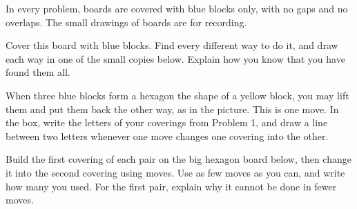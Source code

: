 \documentclass[12pt]{article}
\begin{document}
In every problem, boards are covered with blue blocks only, with no gaps and no overlaps. The small drawings of boards are for recording.

\bigskip
{} Cover this board with blue blocks. Find every different way to do it, and draw each way in one of the small copies below. Explain how you know that you have found them all.

\vspace{0.3in}

\vspace{0.45in}
\centering
{}\hspace{0.35in}\hspace{0.35in}

\vspace{0.3in}
\hspace{0.35in}\hspace{0.35in}

\vspace{0.3in}
\hspace{0.35in}\hspace{0.35in}

\raggedright
\newpage

 When three blue blocks form a hexagon the shape of a yellow block, you may lift them and put them back the other way, as in the picture. This is one move. In the box, write the letters of your coverings from Problem 1, and draw a line between two letters whenever one move changes one covering into the other.

\vspace{0.3in}
\centering
{}\hspace{0.25in}\raisebox{0.55in}{\lrarrow}\hspace{0.25in}

\vspace{0.35in}
\framebox[\linewidth]{\rule{0pt}{4.6in}}

\raggedright
\newpage

 Build the first covering of each pair on the big hexagon board below, then change it into the second covering using moves. Use as few moves as you can, and write how many you used. For the first pair, explain why it cannot be done in fewer moves.

\vspace{0.35in}
\end{document}
